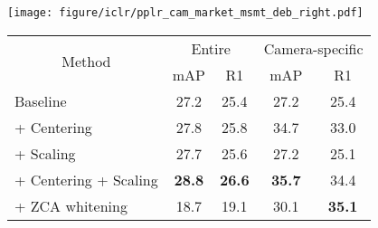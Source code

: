 \begin{table}[t]
\begin{minipage}[c]{0.5\linewidth}
    \centering
    \texttt{[image: figure/iclr/pplr\_cam\_market\_msmt\_deb\_right.pdf]}
    \vspace{-8px}
    \label{fig:vis_debiased}
\end{minipage}\hfill
\begin{minipage}[c]{0.5\linewidth}
\centering
    {
    \scriptsize
    \renewcommand{\arraystretch}{1.1}
    \label{tab:ablation_fd}
    \begin{tabular}{l|cc|cc}
        \hline
        \multicolumn{1}{c|}{\multirow{2}{*}{Method}} & 
        \multicolumn{2}{c|}{Entire} &
        \multicolumn{2}{c}{Camera-specific} \\

        \cline{2-5}
        \multicolumn{1}{c|}{} & 
        mAP & R1 & mAP & R1 \\ 
        \hline \hline
        
        Baseline & 27.2 & 25.4  & 27.2 & 25.4 \\
        \hline
        + Centering   & 27.8  & 25.8 & 34.7 & 33.0 \\
        + Scaling   & 27.7 & 25.6 & 27.2 & 25.1 \\
        + Centering + Scaling   & \textbf{28.8} & \textbf{26.6} &  \textbf{35.7} & 34.4  \\
        \hline
        + ZCA whitening   & 18.7 & 19.1 & 30.1 & \textbf{35.1} \\
        \hline
    \end{tabular}
    }
    \vspace{4pt}
  \end{minipage}
\end{table}


